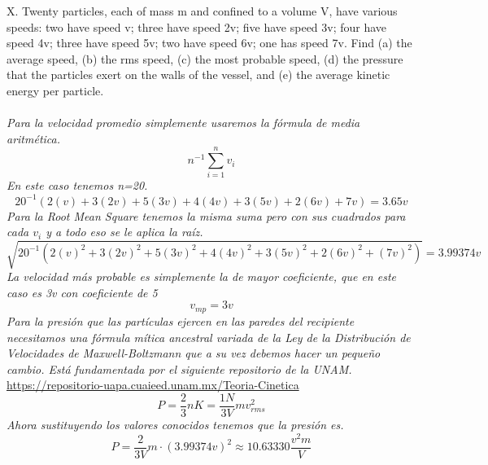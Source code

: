 \documentclass{article}
\begin{document}
X. Twenty particles, each of mass m and confined to a volume V, have various speeds: two have speed v; three have speed 2v; five have speed 3v; four have speed 4v; three have speed 5v; two have speed 6v; one has speed 7v. Find (a) the average speed, (b) the rms speed, (c) the most probable speed, (d) the pressure that the particles exert on the walls of the vessel, and (e) the average kinetic energy per particle. \\\\
\textit{Para la velocidad promedio simplemente usaremos la fórmula de media aritmética.}
\begin{equation}
    n^{-1}\sum_{i=1}^{n} v_i
\end{equation}
\textit{En este caso tenemos n=20.}
\begin{equation*}
    20^{-1}(2(v)+3(2v)+5(3v)+4(4v)+3(5v)+2(6v)+7v) = 3.65v
\end{equation*}
\textit{Para la Root Mean Square tenemos la misma suma pero con sus cuadrados para cada $v_i$ y a todo eso se le aplica la raíz.}
$$\sqrt{20^{-1}(2(v)^2+3(2v)^2+5(3v)^2+4(4v)^2+3(5v)^2+2(6v)^2+(7v)^2)} = 3.99374v$$
\textit{La velocidad más probable es simplemente la de mayor coeficiente, que en este caso es 3v con coeficiente de 5}
\[   v_{mp} = 3v   \]
\textit{Para la presión que las partículas ejercen en las paredes del recipiente necesitamos una fórmula mítica ancestral variada de la Ley de la Distribución de Velocidades de Maxwell-Boltzmann que a su vez debemos hacer un pequeño cambio. Está fundamentada por el siguiente repositorio de la UNAM.}\\
\href{https://repositorio-uapa.cuaieed.unam.mx/repositorio/moodle/pluginfile.php/1989/mod_resource/content/3/contenido/index.html}{https://repositorio-uapa.cuaieed.unam.mx/Teoria-Cinetica}
\begin{equation}
    P = \frac{2}{3}nK = \frac{1N}{3V}mv_{rms}^2
\end{equation}
\textit{Ahora sustituyendo los valores conocidos tenemos que la presión es.}
\begin{equation*}
    P = \frac{2}{3V}m\cdot(3.99374v)^2 \approx 10.63330\frac{v^2m}{V}
\end{equation*}
\end{document}

